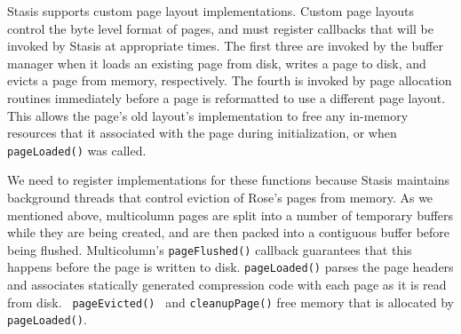 \documentclass{vldb}
\newcommand{\rows}{Rose\xspace}
\newcommand{\rowss}{Rose's\xspace}
\begin{document}
Stasis supports custom page layout implementations.  Custom page
layouts control the byte level format of pages, and must register
callbacks that will be invoked by Stasis at appropriate times.  The
first three are invoked by the buffer manager when it loads an
existing page from disk, writes a page to disk, and evicts a page
from memory, respectively.  The fourth is invoked by page allocation
routines immediately before a page is reformatted to use a different
page layout.  This allows the page's old layout's implementation to
free any in-memory resources that it associated with the page during
initialization, or when {\tt pageLoaded()} was called.





We need to register implementations for these functions because
Stasis maintains background threads that control eviction
of \rowss pages from memory.  As we mentioned above, multicolumn pages
are split into a number of temporary buffers while they are being
created, and are then packed into a contiguous buffer before being
flushed.  Multicolumn's {\tt pageFlushed()} callback guarantees that
this happens before the page is written to disk.  {\tt pageLoaded()}
parses the page headers and associates statically generated
compression code with each page as it is read from disk.  {\tt
  pageEvicted() } and {\tt cleanupPage()} free memory that is
allocated by {\tt pageLoaded()}.
\end{document}

